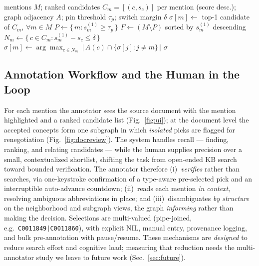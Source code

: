 \documentclass[runningheads]{llncs}
\begin{document}
\begin{algorithm}[t]
\caption{Confidence-gated graph disambiguation}
\label{alg:graph}
\begin{algorithmic}[1]
\Require mentions $M$; ranked candidates $C_m=[(c,s_c)]$ per mention (score desc.);
graph adjacency $A$; pin threshold $\tau_p$; switch margin $\delta$
\State $\sigma[m] \gets$ top-1 candidate of $C_m$, $\forall m\in M$ 
\State $P \gets \{\,m : s^{(1)}_m \ge \tau_p\,\}$ 
\State $F \gets (M \setminus P)$ sorted by $s^{(1)}_m$ descending 
\Repeat
   
    \State $N_m \gets \{\,c \in C_m : s^{(1)}_m - s_c \le \delta\,\}$ 
    \State $\sigma[m] \gets \arg\max_{c \in N_m}\ \big|\,A(c)\cap\{\sigma[j] : j\neq m\}\,\big|$
  \EndFor
{}
\State \Return $\sigma$
\end{algorithmic}
\end{algorithm}

\subsection{Annotation Workflow and the Human in the Loop}
\label{sec:workflow}

For each mention the annotator sees the source document with the mention highlighted
and a ranked candidate list (Fig.~\ref{fig:ui}); at the document level the accepted
concepts form one subgraph in which \emph{isolated} picks are flagged for
renegotiation (Fig.~\ref{fig:docreview}). The system handles recall --- finding,
ranking, and relating candidates --- while the human supplies precision over a small,
contextualized shortlist, shifting the task from open-ended KB search toward bounded
verification. The annotator therefore (i)~\emph{verifies} rather than searches, via
one-keystroke confirmation of a type-aware pre-selected pick and an interruptible
auto-advance countdown; (ii)~reads each mention \emph{in context}, resolving
ambiguous abbreviations in place; and (iii)~disambiguates \emph{by structure} on the
neighborhood and subgraph views, the graph \emph{informing} rather than making the
decision. Selections are multi-valued (pipe-joined, e.g.\
\texttt{C0011849|C0011860}), with explicit NIL, manual entry, provenance logging, and
bulk pre-annotation with pause/resume. These mechanisms are \emph{designed} to reduce
search effort and cognitive load; measuring that reduction needs the multi-annotator
study we leave to future work (Sec.~\ref{sec:future}).
\end{document}
